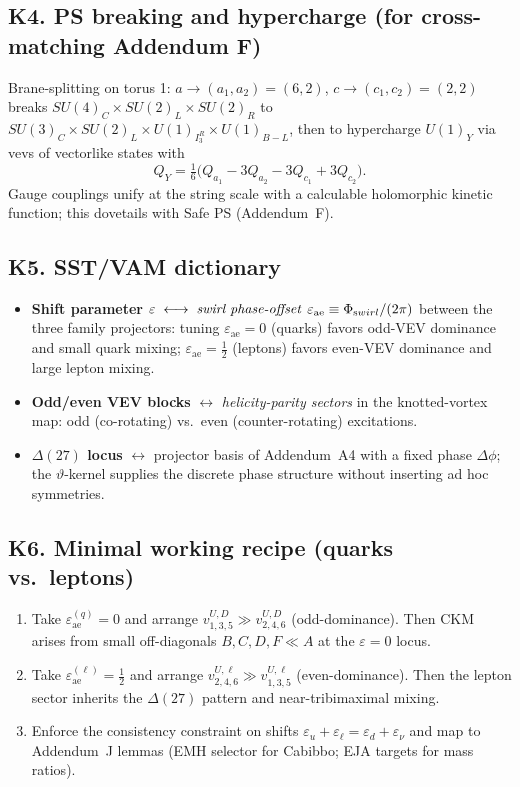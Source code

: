 \documentclass[11pt]{article}
\begin{document}
  \subsection*{K4. PS breaking and hypercharge (for cross-matching Addendum F)}
      Brane-splitting on torus 1:
      $a\rightarrow(a_1,a_2)=(6,2)$, $c\rightarrow(c_1,c_2)=(2,2)$ breaks
      $SU(4)_C\times SU(2)_L\times SU(2)_R$ to
      $SU(3)_C\times SU(2)_L\times U(1)_{I_3^R}\times U(1)_{B-L}$,
      then to hypercharge $U(1)_Y$ via vevs of vectorlike states with
      \[
          Q_Y=\tfrac16\bigl(Q_{a_1}-3Q_{a_2}-3Q_{c_1}+3Q_{c_2}\bigr).
      \]
      Gauge couplings unify at the string scale with a calculable holomorphic kinetic function; this dovetails with Safe PS (Addendum~F).

  \subsection*{K5. SST/VAM dictionary}
      \begin{itemize}
      \item \textbf{Shift parameter} $\varepsilon\;\longleftrightarrow\;
      \emph{swirl phase-offset}$ $\varepsilon_{\text{ae}}\equiv \Phi_{\textrm swirl}/(2\pi)$ between the three family projectors:
      tuning $\varepsilon_{\text{ae}}=0$ (quarks) favors odd-VEV dominance and small quark mixing;
      $\varepsilon_{\text{ae}}=\tfrac12$ (leptons) favors even-VEV dominance and large lepton mixing.
      \item \textbf{Odd/even VEV blocks} $\longleftrightarrow$
      \emph{helicity-parity sectors} in the knotted-vortex map: odd (co-rotating) vs.\ even (counter-rotating) excitations.
      \item \textbf{$\Delta(27)$ locus} $\longleftrightarrow$
      projector basis of Addendum~A4 with a fixed phase $\Delta\phi$; the $\vartheta$-kernel supplies the discrete
      phase structure without inserting ad hoc symmetries.
      \end{itemize}

  \subsection*{K6. Minimal working recipe (quarks vs.\ leptons)}
      \begin{enumerate}
      \item Take $\varepsilon_{\text{ae}}^{(q)}=0$ and arrange $v^{U,D}_{1,3,5}\gg v^{U,D}_{2,4,6}$ (odd-dominance). Then CKM arises from small off-diagonals $B,C,D,F\ll A$ at the $\varepsilon=0$ locus.
      \item Take $\varepsilon_{\text{ae}}^{(\ell)}=\tfrac12$ and arrange $v^{U,\ell}_{2,4,6}\gg v^{U,\ell}_{1,3,5}$ (even-dominance). Then the lepton sector inherits the $\Delta(27)$ pattern and near-tribimaximal mixing.
      \item Enforce the consistency constraint on shifts $\varepsilon_u+\varepsilon_\ell=\varepsilon_d+\varepsilon_\nu$ and map to Addendum~J lemmas (EMH selector for Cabibbo; EJA targets for mass ratios).
      \end{enumerate}
\end{document}
